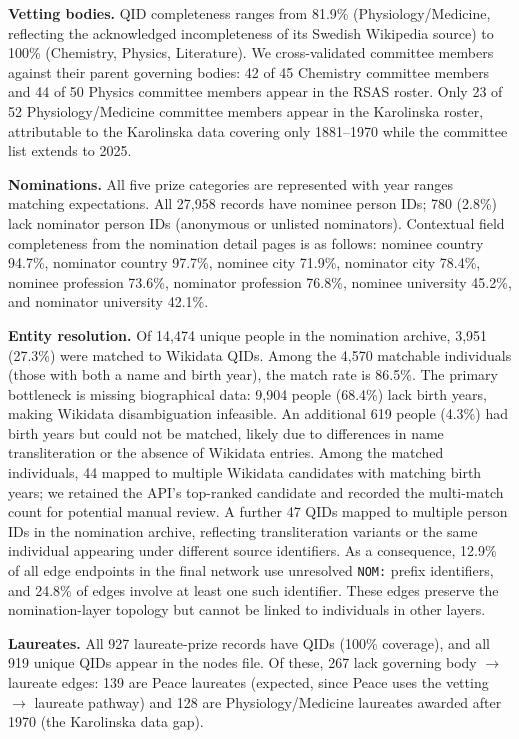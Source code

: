 \documentclass[11pt]{article}
\begin{document}
\textbf{Vetting bodies.} QID completeness ranges from 81.9\% (Physiology/Medicine, reflecting the acknowledged incompleteness of its Swedish Wikipedia source) to 100\% (Chemistry, Physics, Literature). We cross-validated committee members against their parent governing bodies: 42 of 45 Chemistry committee members and 44 of 50 Physics committee members appear in the RSAS roster. Only 23 of 52 Physiology/Medicine committee members appear in the Karolinska roster, attributable to the Karolinska data covering only 1881--1970 while the committee list extends to 2025.

\textbf{Nominations.} All five prize categories are represented with year ranges matching expectations. All 27{,}958 records have nominee person IDs; 780 (2.8\%) lack nominator person IDs (anonymous or unlisted nominators). Contextual field completeness from the nomination detail pages is as follows: nominee country 94.7\%, nominator country 97.7\%, nominee city 71.9\%, nominator city 78.4\%, nominee profession 73.6\%, nominator profession 76.8\%, nominee university 45.2\%, and nominator university 42.1\%.

\textbf{Entity resolution.} Of 14{,}474 unique people in the nomination archive, 3{,}951 (27.3\%) were matched to Wikidata QIDs. Among the 4{,}570 matchable individuals (those with both a name and birth year), the match rate is 86.5\%. The primary bottleneck is missing biographical data: 9{,}904 people (68.4\%) lack birth years, making Wikidata disambiguation infeasible. An additional 619 people (4.3\%) had birth years but could not be matched, likely due to differences in name transliteration or the absence of Wikidata entries. Among the matched individuals, 44 mapped to multiple Wikidata candidates with matching birth years; we retained the API's top-ranked candidate and recorded the multi-match count for potential manual review. A further 47 QIDs mapped to multiple person IDs in the nomination archive, reflecting transliteration variants or the same individual appearing under different source identifiers. As a consequence, 12.9\% of all edge endpoints in the final network use unresolved \texttt{NOM:} prefix identifiers, and 24.8\% of edges involve at least one such identifier. These edges preserve the nomination-layer topology but cannot be linked to individuals in other layers.

\textbf{Laureates.} All 927 laureate-prize records have QIDs (100\% coverage), and all 919 unique QIDs appear in the nodes file. Of these, 267 lack governing body $\to$ laureate edges: 139 are Peace laureates (expected, since Peace uses the vetting $\to$ laureate pathway) and 128 are Physiology/Medicine laureates awarded after 1970 (the Karolinska data gap).
\end{document}

